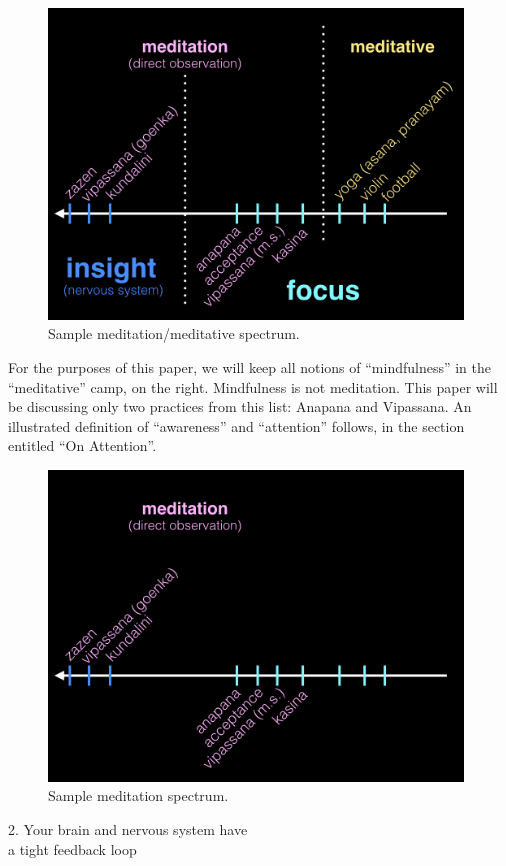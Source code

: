 \documentclass{article}
\begin{document}
\begin{figure}[H]
  \centering
  \includegraphics[width=11cm]{images/meditation-spectrum-1.jpeg}
  \caption{Sample meditation/meditative spectrum.}
  \label{fig:meditation-spectrum-1}
\end{figure}

For the purposes of this paper, we will keep all notions of ``mindfulness'' in the ``meditative'' camp, on the right. Mindfulness is not meditation. This paper will be discussing only two practices from this list: Anapana and Vipassana. An illustrated definition of ``awareness'' and ``attention'' follows, in the section entitled ``On Attention''.

\begin{figure}[H]
  \centering
  \includegraphics[width=11cm]{images/meditation-spectrum-3.jpeg}
  \caption{Sample meditation spectrum.}
  \label{fig:meditation-spectrum-3}
\end{figure}

\vspace{1cm}
\begin{center}
  \LARGE{2. Your brain and nervous system have}\\
  \LARGE{a tight feedback loop}
\end{center}
\end{document}
